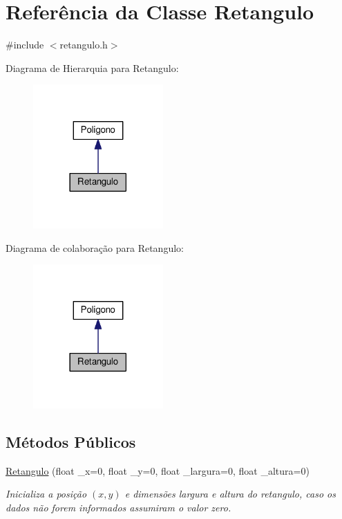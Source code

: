 \hypertarget{class_retangulo}{}\section{Referência da Classe Retangulo}
\label{class_retangulo}


{\ttfamily \#include $<$retangulo.\+h$>$}



Diagrama de Hierarquia para Retangulo\+:\nopagebreak
\begin{figure}[H]
\begin{center}
\leavevmode
\includegraphics[width=141pt]{class_retangulo__inherit__graph}
\end{center}
\end{figure}


Diagrama de colaboração para Retangulo\+:\nopagebreak
\begin{figure}[H]
\begin{center}
\leavevmode
\includegraphics[width=141pt]{class_retangulo__coll__graph}
\end{center}
\end{figure}
\subsection*{Métodos Públicos}
\begin{DoxyCompactItemize}
\item 
\hyperlink{class_retangulo_a53fcd5f31b65aae653972f2d0db004e4}{Retangulo} (float \+\_\+x=0, float \+\_\+y=0, float \+\_\+largura=0, float \+\_\+altura=0)\hypertarget{class_retangulo_a53fcd5f31b65aae653972f2d0db004e4}{}\label{class_retangulo_a53fcd5f31b65aae653972f2d0db004e4}

\begin{DoxyCompactList}\small\item\em Inicializa a posição $(x,y)$ e dimensões largura e altura do retangulo, caso os dados não forem informados assumiram o valor zero. \end{DoxyCompactList}\end{DoxyCompactItemize}


